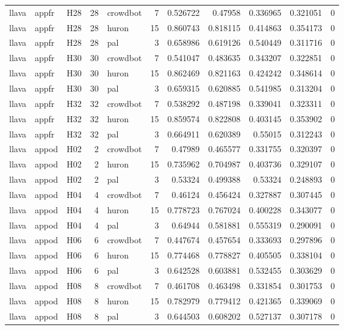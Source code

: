 \begin{longtable}{lllrlrrrrrr}
llava & appfr & H28 & 28 & crowdbot & 7 & 0.526722 & 0.47958 & 0.336965 & 0.321051 & 0 \\
llava & appfr & H28 & 28 & huron & 15 & 0.860743 & 0.818115 & 0.414863 & 0.354173 & 0 \\
llava & appfr & H28 & 28 & pal & 3 & 0.658986 & 0.619126 & 0.540449 & 0.311716 & 0 \\
llava & appfr & H30 & 30 & crowdbot & 7 & 0.541047 & 0.483635 & 0.343207 & 0.322851 & 0 \\
llava & appfr & H30 & 30 & huron & 15 & 0.862469 & 0.821163 & 0.424242 & 0.348614 & 0 \\
llava & appfr & H30 & 30 & pal & 3 & 0.659315 & 0.620885 & 0.541985 & 0.313204 & 0 \\
llava & appfr & H32 & 32 & crowdbot & 7 & 0.538292 & 0.487198 & 0.339041 & 0.323311 & 0 \\
llava & appfr & H32 & 32 & huron & 15 & 0.859574 & 0.822808 & 0.403145 & 0.353902 & 0 \\
llava & appfr & H32 & 32 & pal & 3 & 0.664911 & 0.620389 & 0.55015 & 0.312243 & 0 \\
llava & appod & H02 & 2 & crowdbot & 7 & 0.47989 & 0.465577 & 0.331755 & 0.320397 & 0 \\
llava & appod & H02 & 2 & huron & 15 & 0.735962 & 0.704987 & 0.403736 & 0.329107 & 0 \\
llava & appod & H02 & 2 & pal & 3 & 0.53324 & 0.499388 & 0.53324 & 0.248893 & 0 \\
llava & appod & H04 & 4 & crowdbot & 7 & 0.46124 & 0.456424 & 0.327887 & 0.307445 & 0 \\
llava & appod & H04 & 4 & huron & 15 & 0.778723 & 0.767024 & 0.400228 & 0.343077 & 0 \\
llava & appod & H04 & 4 & pal & 3 & 0.64944 & 0.581881 & 0.555319 & 0.290091 & 0 \\
llava & appod & H06 & 6 & crowdbot & 7 & 0.447674 & 0.457654 & 0.333693 & 0.297896 & 0 \\
llava & appod & H06 & 6 & huron & 15 & 0.774468 & 0.778827 & 0.405505 & 0.338104 & 0 \\
llava & appod & H06 & 6 & pal & 3 & 0.642528 & 0.603881 & 0.532455 & 0.303629 & 0 \\
llava & appod & H08 & 8 & crowdbot & 7 & 0.461708 & 0.463498 & 0.331854 & 0.301753 & 0 \\
llava & appod & H08 & 8 & huron & 15 & 0.782979 & 0.779412 & 0.421365 & 0.339069 & 0 \\
llava & appod & H08 & 8 & pal & 3 & 0.644503 & 0.608202 & 0.527137 & 0.307178 & 0 \\

\end{longtable}
